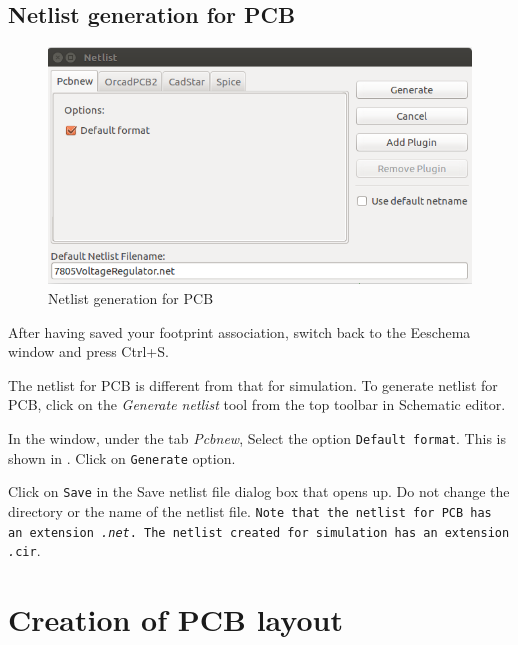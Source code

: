 \subsection{Netlist generation for PCB}
  
\label{netc}
\begin{figure}
\centering
\includegraphics[width=\lgfig]{manual_images/netlistpcb.png}
\caption{Netlist generation for PCB}
\label{netlistpcb}
\end{figure}   
\begin{itemsize}
\begin{compactenum}
\item After having saved your footprint association, switch back to the Eeschema window and press Ctrl+S.
\item The netlist for PCB is different from that for simulation. To generate
netlist for PCB, click on the \textit{Generate netlist} tool from the
top toolbar in Schematic editor.
\item In the  window, under the tab \textit{Pcbnew}, Select the option \texttt{Default format}. This is shown in . Click on \texttt{Generate} option. 
\item Click on \texttt{Save} in the Save netlist file dialog box that opens up. Do not change the directory or the name of the netlist file. \texttt{Note that the netlist for PCB has an extension \emph{.net}. The netlist created for simulation has an extension \emph .cir}.
\end{compactenum}
\end{itemsize}


\section{Creation of PCB layout}
 

